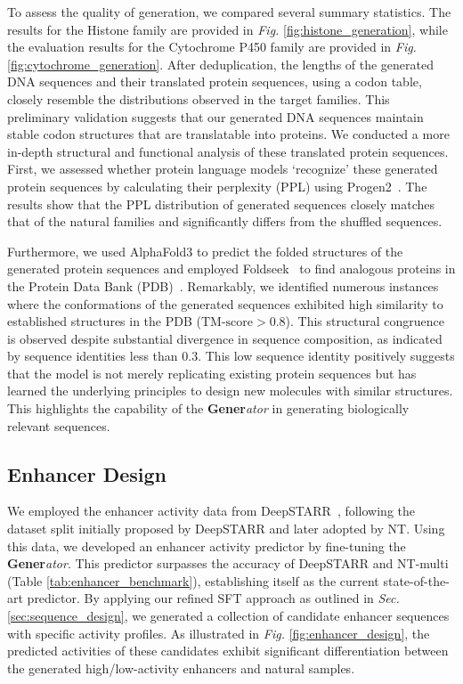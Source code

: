 To assess the quality of generation, we compared several summary statistics. The results for the Histone family are provided in \textit{Fig.} \ref{fig:histone_generation}, while the evaluation results for the Cytochrome P450 family are provided in \textit{Fig.} \ref{fig:cytochrome_generation}.  After deduplication, the lengths of the generated DNA sequences and their translated protein sequences, using a codon table, closely resemble the distributions observed in the target families. This preliminary validation suggests that our generated DNA sequences maintain stable codon structures that are translatable into proteins. We conducted a more in-depth structural and functional analysis of these translated protein sequences. First, we assessed whether protein language models `recognize' these generated protein sequences by calculating their perplexity (PPL) using Progen2~\cite{progen2}. The results show that the PPL distribution of generated sequences closely matches that of the natural families and significantly differs from the shuffled sequences.

Furthermore, we used AlphaFold3 to predict the folded structures of the generated protein sequences and employed Foldseek~\cite{Foldseek} to find analogous proteins in the Protein Data Bank (PDB)~\cite{RCSBPDB}. Remarkably, we identified numerous instances where the conformations of the generated sequences exhibited high similarity to established structures in the PDB ($\text{TM-score}>0.8$). This structural congruence is observed despite substantial divergence in sequence composition, as indicated by sequence identities less than $0.3$. This low sequence identity positively suggests that the model is not merely replicating existing protein sequences but has learned the underlying principles to design new molecules with similar structures. This highlights the capability of the \textbf{Gener}\textit{ator} in generating biologically relevant sequences. 

\subsection{Enhancer Design}
We employed the enhancer activity data from DeepSTARR~\cite{DeepSTARR}, following the dataset split initially proposed by DeepSTARR and later adopted by NT. Using this data, we developed an enhancer activity predictor by fine-tuning the \textbf{Gener}\textit{ator}. This predictor surpasses the accuracy of DeepSTARR and NT-multi (Table \ref{tab:enhancer_benchmark}), establishing itself as the current state-of-the-art predictor. By applying our refined SFT approach as outlined in \textit{Sec.} \ref{sec:sequence_design}, we generated a collection of candidate enhancer sequences with specific activity profiles. As illustrated in \textit{Fig.} \ref{fig:enhancer_design}, the predicted activities of these candidates exhibit significant differentiation between the generated high/low-activity enhancers and natural samples.

